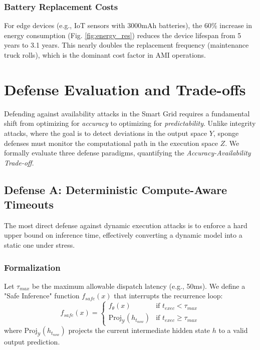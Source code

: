 \documentclass[conference]{IEEEtran}
\begin{document}
\subsubsection{Battery Replacement Costs}
For edge devices (e.g., IoT sensors with 3000mAh batteries), the 60\% increase in energy consumption (Fig. \ref{fig:energy_res}) reduces the device lifespan from 5 years to 3.1 years. This nearly doubles the replacement frequency (maintenance truck rolls), which is the dominant cost factor in AMI operations.

\section{Defense Evaluation and Trade-offs}
\label{sec:mitigation}

Defending against availability attacks in the Smart Grid requires a fundamental shift from optimizing for \textit{accuracy} to optimizing for \textit{predictability}. Unlike integrity attacks, where the goal is to detect deviations in the output space $Y$, sponge defenses must monitor the computational path in the execution space $Z$. We formally evaluate three defense paradigms, quantifying the \textit{Accuracy-Availability Trade-off}.

\subsection{Defense A: Deterministic Compute-Aware Timeouts}
The most direct defense against dynamic execution attacks is to enforce a hard upper bound on inference time, effectively converting a dynamic model into a static one under stress.

\subsubsection{Formalization}
Let $\tau_{max}$ be the maximum allowable dispatch latency (e.g., 50ms). We define a "Safe Inference" function $f_{safe}(x)$ that interrupts the recurrence loop:
\begin{equation}
    f_{safe}(x) = \begin{cases} 
        f_\theta(x) & \text{if } t_{exec} < \tau_{max} \\ 
        \text{Proj}_{\mathcal{Y}}(h_{t_{now}}) & \text{if } t_{exec} \ge \tau_{max} 
    \end{cases}
\end{equation}
where $\text{Proj}_{\mathcal{Y}}(h_{t_{now}})$ projects the current intermediate hidden state $h$ to a valid output prediction.
\end{document}
